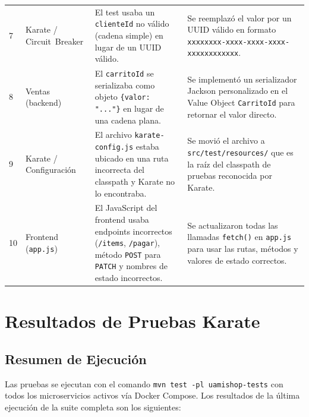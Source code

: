 \documentclass[12pt,a4paper]{article}
\begin{document}
\begin{longtable}{@{}p{0.5cm}p{2.8cm}p{4.5cm}p{5.5cm}@{}}
  7 &
  Karate / Circuit~Breaker &
  El test usaba un \texttt{clienteId} no v\'alido (cadena simple) en lugar de un UUID v\'alido. &
  Se reemplaz\'o el valor por un UUID v\'alido en formato \texttt{xxxxxxxx-xxxx-xxxx-xxxx-xxxxxxxxxxxx}. \\[6pt]

  8 &
  Ventas (backend) &
  El \texttt{carritoId} se serializaba como objeto \texttt{\{valor: "..."\}} en lugar de una cadena plana. &
  Se implement\'o un serializador Jackson personalizado en el Value Object \texttt{CarritoId} para retornar el valor directo. \\[6pt]

  9 &
  Karate / Configuraci\'on &
  El archivo \texttt{karate-config.js} estaba ubicado en una ruta incorrecta del classpath y Karate no lo encontraba. &
  Se movi\'o el archivo a \texttt{src/test/resources/} que es la ra\'iz del classpath de pruebas reconocida por Karate. \\[6pt]

  10 &
  Frontend (\texttt{app.js}) &
  El JavaScript del frontend usaba endpoints incorrectos (\texttt{/items}, \texttt{/pagar}), m\'etodo \texttt{POST} para \texttt{PATCH} y nombres de estado incorrectos. &
  Se actualizaron todas las llamadas \texttt{fetch()} en \texttt{app.js} para usar las rutas, m\'etodos y valores de estado correctos. \\

\end{longtable}

\section{Resultados de Pruebas Karate}

\subsection{Resumen de Ejecuci\'on}

Las pruebas se ejecutan con el comando \texttt{mvn test -pl uamishop-tests} con todos
los microservicios activos v\'ia Docker Compose. Los resultados de la \'ultima ejecuci\'on
de la suite completa son los siguientes:
\end{document}
